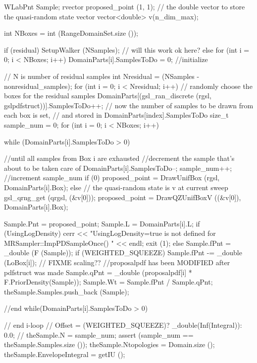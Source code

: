 \begin{DoxyCode}
{
  WLabPnt Sample;
  rvector proposed_point (1, 1);
  // the double vector to store the quasi-random state vector
  vector<double> v(n_dim_max);

  int NBoxes = int (RangeDomainSet.size ());

  if (residual)
  {
    SetupWalker (NSamples);
  }                 // will this work ok here?
  else
  {
    for (int i = 0; i < NBoxes; i++)
    {
      DomainParts[i].SamplesToDo = 0;
    }               //initialize
  }

                    // N is number of residual samples
  int Nresidual = (NSamples - nonresidual_samples);
  for (int i = 0; i < Nresidual; i++)
  {                 // randomly choose the boxes for the residual samples
    DomainParts[(gsl_ran_discrete (rgsl, gslpdfstruct))].SamplesToDo++;
  }
  // now the number of samples to be drawn from each box is set, 
  // and stored in DomainParts[index].SamplesToDo
  size_t sample_num = 0;
  for (int i = 0; i < NBoxes; i++)
  {
    while (DomainParts[i].SamplesToDo > 0)
    {               //until all samples from Box i are exhausted
                    //decrement the sample that's about to be taken care of
      DomainParts[i].SamplesToDo--;
      sample_num++; //increment sample_num
      if (0)
      {
        proposed_point = DrawUnifBox (rgsl, DomainParts[i].Box);
      }
      else
      {
                    // the quasi-random state is v at current sweep
        gsl_qrng_get (qrgsl, (&v[0]));
        proposed_point = DrawQZUnifBoxV ((&v[0]), DomainParts[i].Box);
      }

      Sample.Pnt = proposed_point;
      Sample.L = DomainParts[i].L;
      if (UsingLogDensity)
      {
        cerr <<
          "UsingLogDensity=true is not defined for MRSampler::ImpPDSampleOnce()
      "
          << endl;
        exit (1);
      }
      else
      {
        Sample.fPnt = _double (F (Sample));
        if (WEIGHTED_SQUEEZE)
        {
          Sample.fPnt -= _double (LoBox[i]);
        }           // FIXME scaling??
                    //proposalpdf has been MODIFIED after pdfstruct was made
        Sample.qPnt = _double (proposalpdf[i] * F.PriorDensity(Sample));
        Sample.Wt = Sample.fPnt / Sample.qPnt;
      }
      theSample.Samples.push_back (Sample);
    }               //end while(DomainParts[i].SamplesToDo > 0)
  }                 // end i-loop
  //  Offset = (WEIGHTED_SQUEEZE)? _double(Inf(Integral)): 0.0;
  //  theSample.N = sample_num;
  assert (sample_num == theSample.Samples.size ());
  theSample.Ntopologies = Domain.size ();
  theSample.EnvelopeIntegral = getIU ();
}
\end{DoxyCode}

